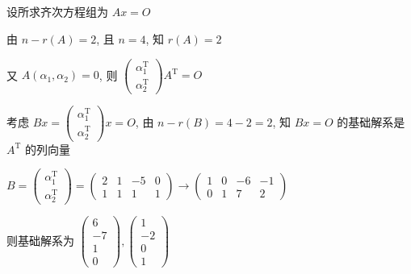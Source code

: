  \subsection{} %


     \paragraph{} %
         设所求齐次方程组为 \( Ax = O \)

         由 \( n - r(A) = 2 \), 且 \( n = 4 \), 知 \( r(A) = 2 \)

         又 \( A(\alpha_{1}, \alpha_{2}) = 0 \), 则 \( \begin{pmatrix}
             \alpha_{1}^{\mathrm{T}} \\
             \alpha_{2}^{\mathrm{T}}
         \end{pmatrix} A^{\mathrm{T}} = O \)

         考虑 \( Bx = \begin{pmatrix}
             \alpha_{1}^{\mathrm{T}} \\
             \alpha_{2}^{\mathrm{T}}
         \end{pmatrix} x = O \), 由 \( n - r(B) = 4 - 2 = 2 \), 知 \( Bx = O \) 的基础解系是 \( A^{\mathrm{T}} \) 的列向量

         \( B = \begin{pmatrix}
             \alpha_{1}^{\mathrm{T}} \\
             \alpha_{2}^{\mathrm{T}}
         \end{pmatrix} = \begin{pmatrix}
             2 & 1 & -5 & 0 \\
             1 & 1 & 1  & 1
         \end{pmatrix} \rightarrow \begin{pmatrix}
             1 & 0 & -6 & -1 \\
             0 & 1 & 7  & 2
         \end{pmatrix} \)

         则基础解系为 \( \begin{pmatrix}
             6  \\
             -7 \\
             1  \\
             0
         \end{pmatrix}, \begin{pmatrix}
             1  \\
             -2 \\
             0  \\
             1
         \end{pmatrix} \)

